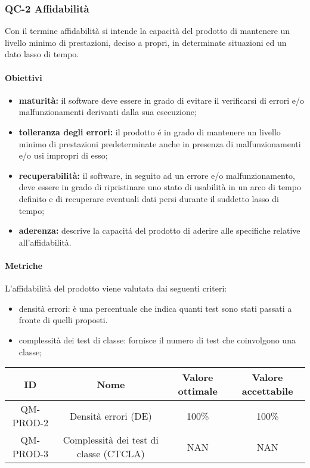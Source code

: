 \subsubsection{QC-2 Affidabilità}
Con il termine affidabilità si intende la capacità del prodotto di mantenere un livello minimo di prestazioni, deciso a propri, in determinate situazioni ed un dato lasso di tempo.
	\paragraph{Obiettivi}
		\begin{itemize}
			\item \textbf{maturità:} il software deve essere in grado di evitare il verificarsi di errori e/o malfunzionamenti derivanti dalla sua esecuzione;
			\item \textbf{tolleranza degli errori:} il prodotto é in grado di mantenere un livello minimo di prestazioni predeterminate anche in presenza di malfunzionamenti e/o usi impropri di esso;
			\item \textbf{recuperabilità:} il software, in seguito ad un errore e/o malfunzionamento, deve essere in grado di ripristinare uno stato di usabilità in un arco di tempo definito e di recuperare eventuali dati persi durante il suddetto lasso di tempo;
			\item \textbf{aderenza:} descrive la capacitá del prodotto di aderire alle specifiche relative all'affidabilità.
		\end{itemize}
	\paragraph{Metriche}
	L'affidabilità del prodotto viene valutata dai seguenti criteri:
	\begin{itemize}
		\item densità errori: è una percentuale che indica quanti test sono stati passati a fronte di quelli proposti.
		\item complessità dei test di classe: fornisce il numero di test che coinvolgono una classe;
	\end{itemize}
	\begin{center}	
		\begin{tabular}{|c|c|c|c|}
			\rowcolor{lighter-grayer}
			\hline
			ID & Nome & Valore ottimale & Valore accettabile \\
			\hline
			QM-PROD-2 & Densità errori (DE) & 100\% & 100\% \\
			\hline
			QM-PROD-3 & Complessità dei test di classe (CTCLA) & NAN & NAN \\
			\hline
		\end{tabular}
	\end{center}
